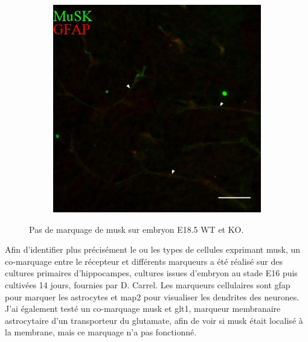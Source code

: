 \begin{figure}[h]
\begin{center}
\begin{subfigure}[h]{0.329\textwidth}
			\end{subfigure}
			\begin{subfigure}[h]{0.329\textwidth}
				\caption{}
				\label{fig:MuskE1KO}
				\includegraphics[width=\textwidth]{./Images/Immuno/Musk/Embryon/E1KO_50um_500px_df.jpg}
			\end{subfigure}
		\end{center}
		\caption{Pas de marquage de \gls{musk} sur embryon E18.5 WT et KO.}
		\label{fig:MuskEmbryon}
	\end{figure}
\FloatBarrier

	Afin d'identifier plus précisément le ou les types de cellules exprimant \gls{musk}, un co-marquage entre le récepteur et différents marqueurs a été réalisé sur des cultures primaires d'hippocampes, cultures issues d'embryon au stade E16 puis cultivées 14 jours, fournies par D. Carrel. Les marqueurs cellulaires sont \gls{gfap} pour marquer les astrocytes et \gls{map2} pour visualiser les dendrites des neurones. J'ai également testé un co-marquage \gls{musk} et \gls{glt1}, marqueur membranaire astrocytaire d'un transporteur du glutamate, afin de voir si \gls{musk} était localisé à la membrane, mais ce marquage n'a pas fonctionné.
	
